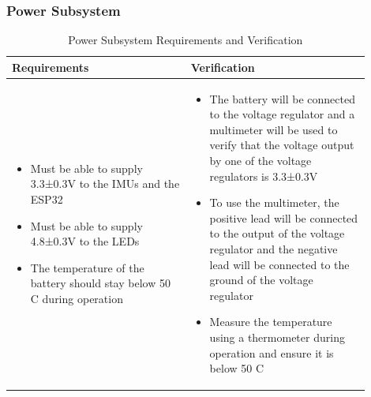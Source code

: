 \subsubsection{Power Subsystem}
\begin{table}[ht]
    \centering
    \caption{Power Subsystem Requirements and Verification}
    \begin{tabular}{p{0.45\linewidth}p{0.45\linewidth}}
    \toprule
    \textbf{Requirements} & \textbf{Verification} \\
    \midrule
    \begin{itemize}[leftmargin=*, nosep, after=\strut]
        \item Must be able to supply 3.3±0.3V to the IMUs and the ESP32
        \item Must be able to supply 4.8±0.3V to the LEDs
        \item The temperature of the battery should stay below 50 C during operation
        
    \end{itemize} &
    \begin{itemize}[leftmargin=*, nosep, after=\strut]
        \item The battery will be connected to the voltage regulator and a multimeter will be used to verify that the voltage output by one of the voltage regulators is 3.3±0.3V
        \item To use the multimeter, the positive lead will be connected to the output of the voltage regulator and the negative lead will be connected to the ground of the voltage regulator
        \item Measure the temperature using a thermometer during operation and ensure it is below 50 C
    \end{itemize} \\
    \bottomrule
    \end{tabular}
    \end{table}

